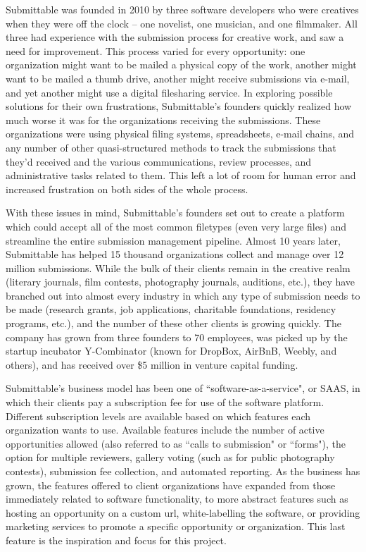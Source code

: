 \documentclass[12pt]{report}   %
\begin{document}
Submittable was founded in 2010 by three software developers who were creatives when they were off the clock -- one novelist, one musician, and one filmmaker. All three had experience with the submission process for creative work, and saw a need for improvement. This process varied for every opportunity: one organization might want to be mailed a physical copy of the work, another might want to be mailed a thumb drive, another might receive submissions via e-mail, and yet another might use a digital filesharing service. In exploring possible solutions for their own frustrations, Submittable's founders quickly realized how much worse it was for the organizations receiving the submissions. These organizations were using physical filing systems, spreadsheets, e-mail chains, and any number of other quasi-structured methods to track the submissions that they'd received and the various communications, review processes, and administrative tasks related to them. This left a lot of room for human error and increased frustration on both sides of the whole process.

With these issues in mind, Submittable's founders set out to create a platform which could accept all of the most common filetypes (even very large files) and streamline the entire submission management pipeline. Almost 10 years later, Submittable has helped 15 thousand organizations collect and manage over 12 million submissions. While the bulk of their clients remain in the creative realm (literary journals, film contests, photography journals, auditions, etc.), they have branched out into almost every industry in which any type of submission needs to be made (research grants, job applications, charitable foundations, residency programs, etc.), and the number of these other clients is growing quickly. The company has grown from three founders to 70 employees, was picked up by the startup incubator Y-Combinator (known for DropBox, AirBnB, Weebly, and others), and has received over \$5 million in venture capital funding. 

Submittable's business model has been one of ``software-as-a-service", or SAAS, in which their clients pay a subscription fee for use of the software platform. Different subscription levels are available based on which features each organization wants to use. Available features include the number of active opportunities allowed (also referred to as ``calls to submission" or ``forms"), the option for multiple reviewers, gallery voting (such as for public photography contests), submission fee collection, and automated reporting. As the business has grown, the features offered to client organizations have expanded from those immediately related to software functionality, to more abstract features such as hosting an opportunity on a custom url, white-labelling the software, or providing marketing services to promote a specific opportunity or organization. This last feature is the inspiration and focus for this project.
\end{document}
